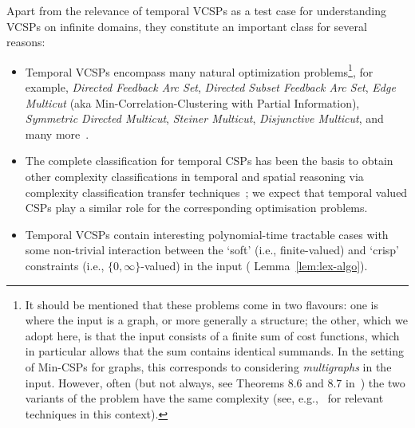 \documentclass[preprint,12pt]{elsarticle}
\begin{document}
Apart from the relevance of temporal VCSPs as a test case for understanding VCSPs on infinite domains, 
they constitute an important class for several reasons:
\begin{itemize}
\item 
Temporal VCSPs encompass many natural optimization problems\footnote{It should be mentioned that these problems come in two flavours: one is where the input is a graph, or more generally a structure; the other, which we adopt here, is that the input consists of a finite sum of cost functions, which in particular allows that the sum contains identical summands. In the setting of Min-CSPs for graphs, this corresponds to considering \emph{multigraphs} in  the input. However, often (but not always, see Theorems 8.6 and 8.7 in~\cite{LatestResilience}) the two variants of the problem have the same complexity (see, e.g.,~\cite[Section 2.3]{Interval} for relevant techniques in this context).}, for example, \emph{Directed Feedback Arc Set}, \emph{Directed Subset Feedback Arc Set}, \emph{Edge Multicut} (aka Min-Correlation-Clustering with Partial Information), 
\emph{Symmetric Directed Multicut},
\emph{Steiner Multicut}, \emph{Disjunctive Multicut}, and many more~\cite{Multicut,EibenRW22,OsipovPilipczuk,OsipovW23,PointAlgebraMinCSP}.
\item The complete classification for temporal CSPs has been the basis to obtain other complexity classifications in temporal and spatial reasoning via complexity classification transfer techniques~\cite{Products}; we expect that temporal valued CSPs play a similar role for the corresponding optimisation problems.
\item Temporal VCSPs contain interesting polynomial-time tractable cases with some non-trivial interaction between the `soft' (i.e., finite-valued) and `crisp' constraints (i.e., $\{0,\infty\}$-valued) in the input ( Lemma~\ref{lem:lex-algo}). 
\end{itemize} 
\end{document}
